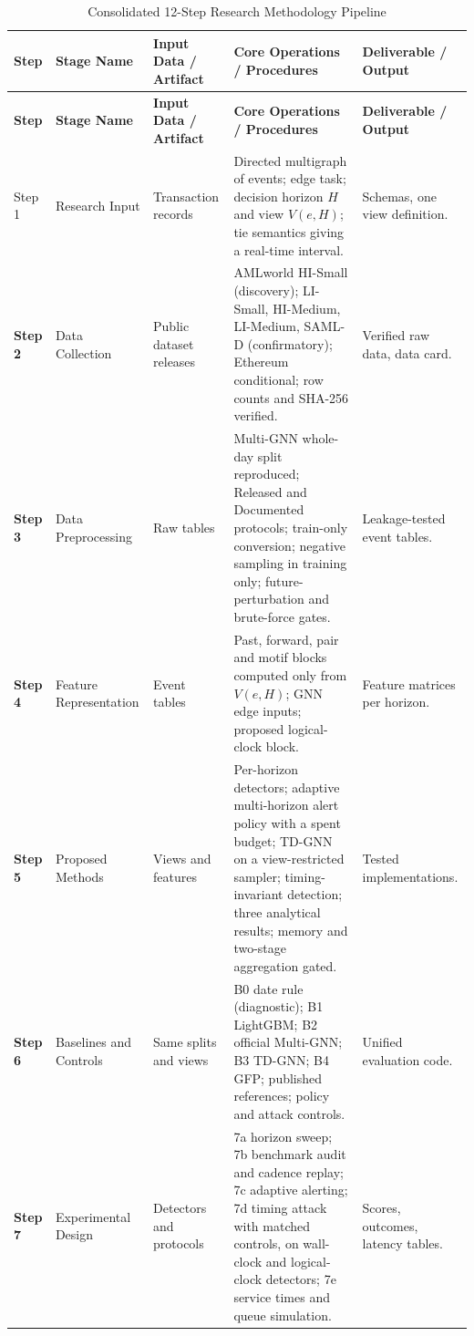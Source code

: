 \documentclass[11pt,a4paper]{article}
\begin{document}
\begin{landscape}
\small
\begin{xltabular}{\linewidth}{>{\bfseries}l l X X X}
\caption{Consolidated 12-Step Research Methodology Pipeline} \label{tab:methodology_summary} \\
\toprule
\textbf{Step} & \textbf{Stage Name} & \textbf{Input Data / Artifact} & \textbf{Core Operations / Procedures} & \textbf{Deliverable / Output} \\
\midrule
\endfirsthead

\toprule
\textbf{Step} & \textbf{Stage Name} & \textbf{Input Data / Artifact} & \textbf{Core Operations / Procedures} & \textbf{Deliverable / Output} \\
\midrule
\endhead

\bottomrule
\endfoot

Step 1 & Research Input & Transaction records & Directed multigraph of events; edge task; decision horizon $H$ and view $V(e,H)$; tie semantics giving a real-time interval. & Schemas, one view definition. \\
\midrule
Step 2 & Data Collection & Public dataset releases & AMLworld HI-Small (discovery); LI-Small, HI-Medium, LI-Medium, SAML-D (confirmatory); Ethereum conditional; row counts and SHA-256 verified. & Verified raw data, data card. \\
\midrule
Step 3 & Data Preprocessing & Raw tables & Multi-GNN whole-day split reproduced; Released and Documented protocols; train-only conversion; negative sampling in training only; future-perturbation and brute-force gates. & Leakage-tested event tables. \\
\midrule
Step 4 & Feature Representation & Event tables & Past, forward, pair and motif blocks computed only from $V(e,H)$; GNN edge inputs; proposed logical-clock block. & Feature matrices per horizon. \\
\midrule
Step 5 & Proposed Methods & Views and features & Per-horizon detectors; adaptive multi-horizon alert policy with a spent budget; TD-GNN on a view-restricted sampler; timing-invariant detection; three analytical results; memory and two-stage aggregation gated. & Tested implementations. \\
\midrule
Step 6 & Baselines and Controls & Same splits and views & B0 date rule (diagnostic); B1 LightGBM; B2 official Multi-GNN; B3 TD-GNN; B4 GFP; published references; policy and attack controls. & Unified evaluation code. \\
\midrule
Step 7 & Experimental Design & Detectors and protocols & 7a horizon sweep; 7b benchmark audit and cadence replay; 7c adaptive alerting; 7d timing attack with matched controls, on wall-clock and logical-clock detectors; 7e service times and queue simulation. & Scores, outcomes, latency tables. \\

\end{xltabular}
\end{landscape}
\end{document}
